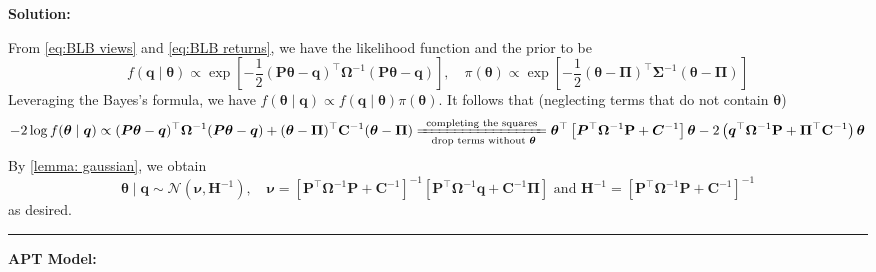 \documentclass[11pt]{article}
\theoremstyle{plain} %
\newenvironment{solution}
{\color{C2}\normalfont\begin{framed}\begingroup\textbf{Solution:} }
  {\endgroup\end{framed}}
\theoremstyle{remark}
\begin{document}
\begin{solution}
\begin{enumerate}[label=(\alph*)]
          From \cref{eq:BLB views} and \cref{eq:BLB returns}, we have the likelihood function and the prior to be
          $$
            f(\boldsymbol{q} \mid \boldsymbol{\theta}) \propto \exp \left[-\frac{1}{2}(\boldsymbol{P} \boldsymbol{\theta}-\boldsymbol{q})^\top \boldsymbol{\Omega}^{-1}(\boldsymbol{P} \boldsymbol{\theta}-\boldsymbol{q})\right], \quad \pi(\boldsymbol{\theta}) \propto \exp \left[-\frac{1}{2}(\boldsymbol{\theta} -\boldsymbol{\Pi})^\top \boldsymbol{\Sigma}^{-1}(\boldsymbol{\theta} -\boldsymbol{\Pi})\right]
          $$
          Leveraging the Bayes's formula, we have $f(\boldsymbol{\theta}\mid \boldsymbol{q}) \propto f(\boldsymbol{q} \mid \boldsymbol{\theta}) \pi(\boldsymbol{\theta})$. It follows that (neglecting terms that do not contain $\boldsymbol{\theta}$)
          $$
            -2\log f(\boldsymbol{\theta}\mid \boldsymbol{q}) \propto (\boldsymbol{P} \boldsymbol{\theta} -\boldsymbol{q})^\top \boldsymbol{\Omega}^{-1}(\boldsymbol{P} \boldsymbol{\theta}-\boldsymbol{q})+(\boldsymbol{\theta}-\boldsymbol{\Pi})^\top \mathbf{C}^{-1}(\boldsymbol{\theta}-\boldsymbol{\Pi}) \xlongequal[\text{ drop terms without $\boldsymbol{\theta}$}]{\text{ completing the squares }}\boldsymbol{\theta}^\top\left[\boldsymbol{P}^\top \boldsymbol{\Omega}^{-1} \mathbf{P}+\boldsymbol{C}^{-1}\right] \boldsymbol{\theta}-2\left(\boldsymbol{q}^\top \boldsymbol{\Omega}^{-1} \mathbf{P}+\boldsymbol{\Pi}^\top \mathbf{C}^{-1}\right) \boldsymbol{\theta}
          $$
          By \cref{lemma: gaussian}, we obtain
          $$
            \boldsymbol{\theta}\mid \boldsymbol{q} \sim \mathcal{N}\left(\boldsymbol{\nu}, \boldsymbol{H}^{-1}\right), \quad \boldsymbol{\nu}=\left[\boldsymbol{P}^\top \boldsymbol{\Omega}^{-1} \boldsymbol{P}+\boldsymbol{C}^{-1}\right]^{-1}\left[\boldsymbol{P}^\top \boldsymbol{\Omega}^{-1} \boldsymbol{q}+\boldsymbol{C}^{-1} \boldsymbol{\Pi}\right] \text{ and } \boldsymbol{H}^{-1}=\left[\boldsymbol{P}^\top \boldsymbol{\Omega}^{-1} \boldsymbol{P}+\boldsymbol{C}^{-1}\right]^{-1}
          $$
          as desired.

  \end{enumerate}
  \vspace*{1em}
  \hrule

  \textbf{APT Model:}


\end{solution}
\end{document}
